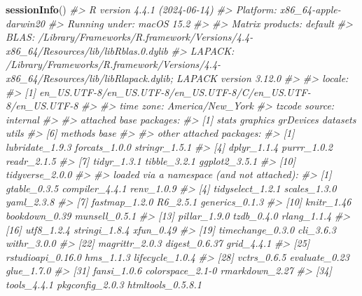 \documentclass[
]{book}
\newenvironment{Shaded}{\begin{snugshade}}{\end{snugshade}}
\newcommand{\CommentTok}[1]{\textcolor[rgb]{0.56,0.35,0.01}{\textit{#1}}}
\newcommand{\FunctionTok}[1]{\textcolor[rgb]{0.13,0.29,0.53}{\textbf{#1}}}
\newcommand{\NormalTok}[1]{#1}
\begin{document}
\begin{Shaded}
\begin{Highlighting}[]
\FunctionTok{sessionInfo}\NormalTok{()}
\CommentTok{\#\textgreater{} R version 4.4.1 (2024{-}06{-}14)}
\CommentTok{\#\textgreater{} Platform: x86\_64{-}apple{-}darwin20}
\CommentTok{\#\textgreater{} Running under: macOS 15.2}
\CommentTok{\#\textgreater{} }
\CommentTok{\#\textgreater{} Matrix products: default}
\CommentTok{\#\textgreater{} BLAS:   /Library/Frameworks/R.framework/Versions/4.4{-}x86\_64/Resources/lib/libRblas.0.dylib }
\CommentTok{\#\textgreater{} LAPACK: /Library/Frameworks/R.framework/Versions/4.4{-}x86\_64/Resources/lib/libRlapack.dylib;  LAPACK version 3.12.0}
\CommentTok{\#\textgreater{} }
\CommentTok{\#\textgreater{} locale:}
\CommentTok{\#\textgreater{} [1] en\_US.UTF{-}8/en\_US.UTF{-}8/en\_US.UTF{-}8/C/en\_US.UTF{-}8/en\_US.UTF{-}8}
\CommentTok{\#\textgreater{} }
\CommentTok{\#\textgreater{} time zone: America/New\_York}
\CommentTok{\#\textgreater{} tzcode source: internal}
\CommentTok{\#\textgreater{} }
\CommentTok{\#\textgreater{} attached base packages:}
\CommentTok{\#\textgreater{} [1] stats     graphics  grDevices datasets  utils    }
\CommentTok{\#\textgreater{} [6] methods   base     }
\CommentTok{\#\textgreater{} }
\CommentTok{\#\textgreater{} other attached packages:}
\CommentTok{\#\textgreater{}  [1] lubridate\_1.9.3 forcats\_1.0.0   stringr\_1.5.1  }
\CommentTok{\#\textgreater{}  [4] dplyr\_1.1.4     purrr\_1.0.2     readr\_2.1.5    }
\CommentTok{\#\textgreater{}  [7] tidyr\_1.3.1     tibble\_3.2.1    ggplot2\_3.5.1  }
\CommentTok{\#\textgreater{} [10] tidyverse\_2.0.0}
\CommentTok{\#\textgreater{} }
\CommentTok{\#\textgreater{} loaded via a namespace (and not attached):}
\CommentTok{\#\textgreater{}  [1] gtable\_0.3.5      compiler\_4.4.1    renv\_1.0.9       }
\CommentTok{\#\textgreater{}  [4] tidyselect\_1.2.1  scales\_1.3.0      yaml\_2.3.8       }
\CommentTok{\#\textgreater{}  [7] fastmap\_1.2.0     R6\_2.5.1          generics\_0.1.3   }
\CommentTok{\#\textgreater{} [10] knitr\_1.46        bookdown\_0.39     munsell\_0.5.1    }
\CommentTok{\#\textgreater{} [13] pillar\_1.9.0      tzdb\_0.4.0        rlang\_1.1.4      }
\CommentTok{\#\textgreater{} [16] utf8\_1.2.4        stringi\_1.8.4     xfun\_0.49        }
\CommentTok{\#\textgreater{} [19] timechange\_0.3.0  cli\_3.6.3         withr\_3.0.0      }
\CommentTok{\#\textgreater{} [22] magrittr\_2.0.3    digest\_0.6.37     grid\_4.4.1       }
\CommentTok{\#\textgreater{} [25] rstudioapi\_0.16.0 hms\_1.1.3         lifecycle\_1.0.4  }
\CommentTok{\#\textgreater{} [28] vctrs\_0.6.5       evaluate\_0.23     glue\_1.7.0       }
\CommentTok{\#\textgreater{} [31] fansi\_1.0.6       colorspace\_2.1{-}0  rmarkdown\_2.27   }
\CommentTok{\#\textgreater{} [34] tools\_4.4.1       pkgconfig\_2.0.3   htmltools\_0.5.8.1}
\end{Highlighting}
\end{Shaded}
\end{document}
